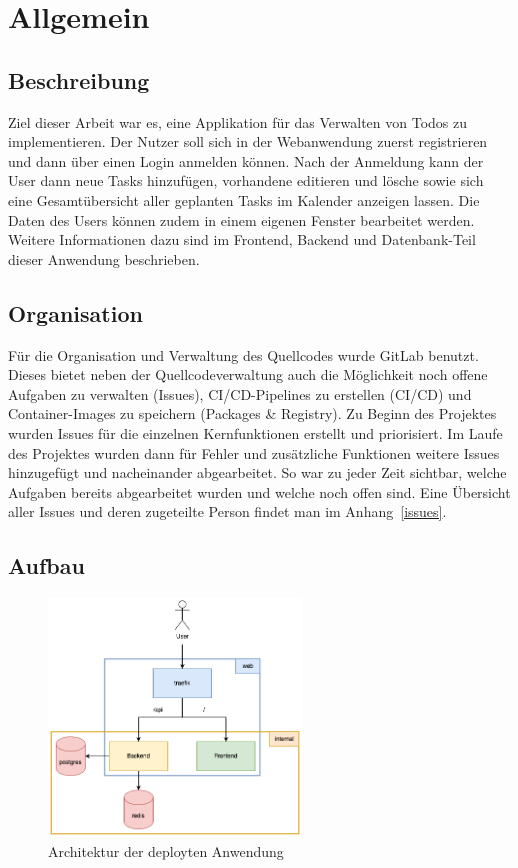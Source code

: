 \documentclass[a4paper, 12pt]{article}
\begin{document}
\newpage
    \section{Allgemein}
    \subsection{Beschreibung}
    Ziel dieser Arbeit war es, eine Applikation für das Verwalten von Todos zu implementieren. Der Nutzer soll sich in der Webanwendung zuerst 
    registrieren und dann über einen Login anmelden können. Nach der Anmeldung kann der User dann neue Tasks hinzufügen, vorhandene editieren
    und lösche sowie sich eine Gesamtübersicht aller geplanten Tasks im Kalender anzeigen lassen. Die Daten des Users können zudem
    in einem eigenen Fenster bearbeitet werden. Weitere Informationen dazu sind im Frontend, Backend und Datenbank-Teil dieser Anwendung
    beschrieben.

    \subsection{Organisation}
    Für die Organisation und Verwaltung des Quellcodes wurde GitLab benutzt. Dieses bietet neben der Quellcodeverwaltung auch die 
    Möglichkeit noch offene Aufgaben zu verwalten (Issues), CI/CD-Pipelines zu erstellen (CI/CD) und Container-Images zu speichern (Packages \& Registry).
    Zu Beginn des Projektes wurden Issues für die einzelnen Kernfunktionen erstellt und priorisiert. 
    Im Laufe des Projektes wurden dann für Fehler und zusätzliche Funktionen weitere Issues hinzugefügt und nacheinander abgearbeitet.
    So war zu jeder Zeit sichtbar, welche Aufgaben bereits abgearbeitet wurden und welche noch offen sind. 
    Eine Übersicht aller Issues und deren zugeteilte Person findet man im Anhang~\ref{issues}.

    \subsection{Aufbau}

    \begin{figure}[H]
        \center\includegraphics[width=0.6\textwidth]{../images/architecture.drawio}
        \caption{Architektur der deployten Anwendung}\label{fig:figure}
    \end{figure}
\end{document}
